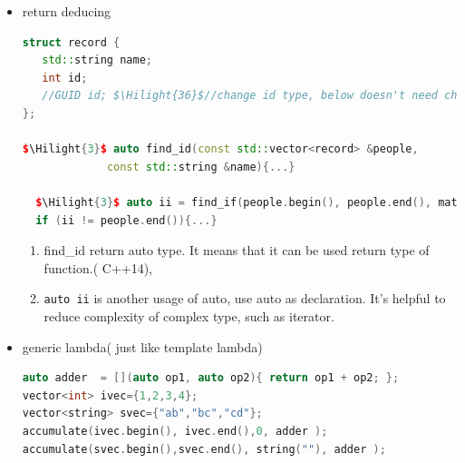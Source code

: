 \documentclass[a4paper,12pt,twoside]{book}
\newcommand{\Hilight}[1]{\makebox[0pt][l]{\color{yellow}\rule[-3pt]{#1em}{11pt}}}
\begin{document}
\begin{itemize}
\item return deducing
\begin{lstlisting}[frame=single, language=c++, mathescape=true]
struct record {
   std::string name;
   int id;
   //GUID id; $\Hilight{36}$//change id type, below doesn't need change
};

$\Hilight{3}$ auto find_id(const std::vector<record> &people,
             const std::string &name){...}

  $\Hilight{3}$ auto ii = find_if(people.begin(), people.end(), match_name );
  if (ii != people.end()){...}
\end{lstlisting}

\begin{enumerate}
\item find\_id return auto type. It means that it can be used return type of function.( C++14),
\item \verb=auto ii= is another usage of auto,  use auto as declaration. It's helpful to reduce complexity of complex type, such as iterator.
\end{enumerate}

\item generic lambda( just like template lambda)
\begin{lstlisting}[frame=single, language=c++]
auto adder  = [](auto op1, auto op2){ return op1 + op2; };
vector<int> ivec={1,2,3,4};
vector<string> svec={"ab","bc","cd"};
accumulate(ivec.begin(), ivec.end(),0, adder );
accumulate(svec.begin(),svec.end(), string(""), adder );
\end{lstlisting}

\end{itemize}
\end{document}
